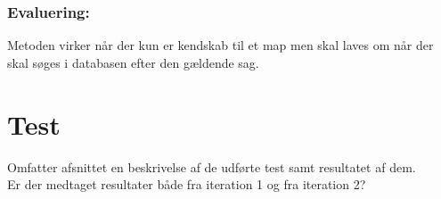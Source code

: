 \subsubsection{Evaluering:}
Metoden virker når der kun er kendskab til et map men skal laves om når der skal søges i databasen efter den gældende sag.


\section{Test}
Omfatter afsnittet en beskrivelse af de udførte test samt resultatet af dem.\\
Er der medtaget resultater både fra iteration 1 og fra iteration 2?\\
